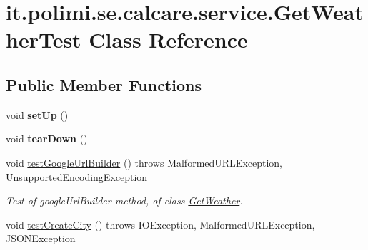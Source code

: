 \hypertarget{classit_1_1polimi_1_1se_1_1calcare_1_1service_1_1GetWeatherTest}{}\section{it.\+polimi.\+se.\+calcare.\+service.\+Get\+Weather\+Test Class Reference}
\label{classit_1_1polimi_1_1se_1_1calcare_1_1service_1_1GetWeatherTest}
\subsection*{Public Member Functions}
\begin{DoxyCompactItemize}
\item 
\hypertarget{classit_1_1polimi_1_1se_1_1calcare_1_1service_1_1GetWeatherTest_a82f8531eb5d015aedd627c6cc8eee188}{}void {\bfseries set\+Up} ()\label{classit_1_1polimi_1_1se_1_1calcare_1_1service_1_1GetWeatherTest_a82f8531eb5d015aedd627c6cc8eee188}

\item 
\hypertarget{classit_1_1polimi_1_1se_1_1calcare_1_1service_1_1GetWeatherTest_a9d16e1f7f237873a0a6f7b57702eee1d}{}void {\bfseries tear\+Down} ()\label{classit_1_1polimi_1_1se_1_1calcare_1_1service_1_1GetWeatherTest_a9d16e1f7f237873a0a6f7b57702eee1d}

\item 
\hypertarget{classit_1_1polimi_1_1se_1_1calcare_1_1service_1_1GetWeatherTest_a99d86fb1193ef9df8720dbb288058b01}{}void \hyperlink{classit_1_1polimi_1_1se_1_1calcare_1_1service_1_1GetWeatherTest_a99d86fb1193ef9df8720dbb288058b01}{test\+Google\+Url\+Builder} ()  throws Malformed\+U\+R\+L\+Exception, Unsupported\+Encoding\+Exception\label{classit_1_1polimi_1_1se_1_1calcare_1_1service_1_1GetWeatherTest_a99d86fb1193ef9df8720dbb288058b01}

\begin{DoxyCompactList}\small\item\em Test of google\+Url\+Builder method, of class \hyperlink{classit_1_1polimi_1_1se_1_1calcare_1_1service_1_1GetWeather}{Get\+Weather}. \end{DoxyCompactList}\item 
\hypertarget{classit_1_1polimi_1_1se_1_1calcare_1_1service_1_1GetWeatherTest_a33ceaf374463725008baf616ccffe54d}{}void \hyperlink{classit_1_1polimi_1_1se_1_1calcare_1_1service_1_1GetWeatherTest_a33ceaf374463725008baf616ccffe54d}{test\+Create\+City} ()  throws I\+O\+Exception, Malformed\+U\+R\+L\+Exception, J\+S\+O\+N\+Exception\label{classit_1_1polimi_1_1se_1_1calcare_1_1service_1_1GetWeatherTest_a33ceaf374463725008baf616ccffe54d}


\end{DoxyCompactItemize}
